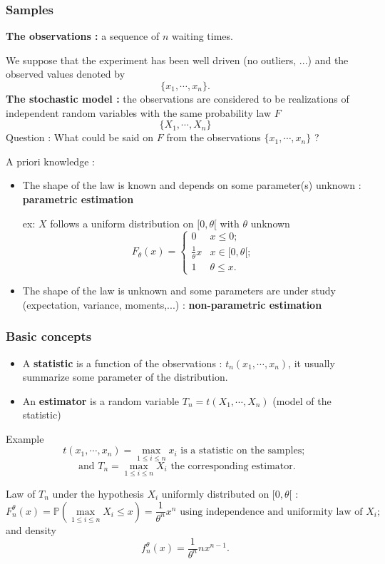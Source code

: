 \documentclass[xcolor=x11names,compress,8pt,handout]{beamer}
\def\leq{\leqslant}
\def\Prob{\mathbb{P}}
\renewcommand{\(}{\begin{columns}}
\renewcommand{\)}{\end{columns}}
\newcommand{\<}[1]{\begin{column}{#1}}
\renewcommand{\>}{\end{column}}
\begin{document}
\begin{frame}
\frametitle{Samples}
\textbf{The observations :} a sequence of $n$ waiting times. 

We suppose that the experiment  has been well driven  (no outliers, ...) and the observed values  denoted by
\[
\{x_1,\cdots, x_n\}.
\]
\textbf{The stochastic model :}
the observations are considered to be  realizations of independent random variables with the same probability law $F$
\[
\{X_1,\cdots , X_n\}
\]
Question : \alert{What could be said on $F$ from the observations $\{x_1,\cdots, x_n\}$ ?}

\begin{exampleblock}{A priori knowledge : }
\begin{itemize}
\item The shape of the law is known and depends on some parameter(s) unknown : \alert{\textbf{parametric estimation}}

ex: $X$ follows a uniform distribution on $[0,\theta[$ with $\theta$ unknown
\[
F_\theta(x)=
\begin{cases} 
0 & x\leq 0;\\
\frac 1 \theta x & x\in [0,\theta[;\\
1 & \theta \leq x.
\end{cases}
\]
\item The shape of the law is unknown and some parameters are under study (expectation, variance, moments,...) : \alert{\textbf{non-parametric estimation}}
\end{itemize}
\end{exampleblock}
\end{frame}
\begin{frame}
\frametitle{Basic concepts}
\begin{itemize}
\item A \textbf{statistic} is a function of the observations : $t_n(x_1,\cdots, x_n)$, it usually summarize some parameter of the distribution.
\item An \textbf{estimator} is a random variable $T_n=t(X_1, \cdots, X_n)$ (model of the statistic)
\end{itemize}
\begin{exampleblock}{Example}
\[
t(x_1,\cdots, x_n)=\max_{1\leq i \leq n}x_i \text{ is a statistic on the samples; }
\] 
\[\text{ and  } T_n=\max_{1\leq i \leq n}X_i \text{ the corresponding estimator.}
\]

Law of $T_n$ under the hypothesis $X_i$ uniformly distributed on $[0,\theta[$ :
\[
F_n^\theta(x)=\Prob(\max_{1\leq i \leq n}X_i\leq x) = \frac 1{\theta^n} x^n \text{ using independence and uniformity law of } X_i;
\]
and density
\[
f_n^\theta(x)=\frac 1{\theta^n} n x^{n-1}.
\]

\end{exampleblock}
\end{frame}
\end{document}
